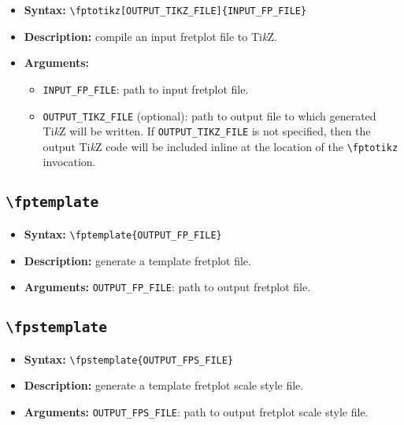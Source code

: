 \documentclass[12pt,letterpaper]{article}
\begin{document}
\begin{itemize}
  \item[] \textbf{\color{blue} Syntax:} \texttt{\textbackslash fptotikz[OUTPUT\_TIKZ\_FILE]\{INPUT\_FP\_FILE\}}
  \item[] \textbf{\color{blue} Description:} compile an input fretplot file to Ti\textit{k}Z.
  \item[] \textbf{\color{blue} Arguments:}
    \begin{itemize}
      \item \texttt{INPUT\_FP\_FILE}: path to input fretplot file.
      \item \texttt{OUTPUT\_TIKZ\_FILE} (optional): path to output file to which generated Ti\textit{k}Z will be written. If \texttt{OUTPUT\_TIKZ\_FILE} is not specified, then the output Ti\textit{k}Z code will be included inline at the location of the \texttt{\textbackslash fptotikz} invocation.
    \end{itemize}
\end{itemize}

\subsection{\texttt{\textbackslash fptemplate}}

\begin{itemize}
  \item[] \textbf{\color{blue} Syntax:} \texttt{\textbackslash fptemplate\{OUTPUT\_FP\_FILE\}}
  \item[] \textbf{\color{blue} Description:} generate a template fretplot file.
  \item[] \textbf{\color{blue} Arguments:} \texttt{OUTPUT\_FP\_FILE}: path to output fretplot file.
\end{itemize}

\subsection{\texttt{\textbackslash fpstemplate}}

\begin{itemize}
  \item[] \textbf{\color{blue} Syntax:} \texttt{\textbackslash fpstemplate\{OUTPUT\_FPS\_FILE\}}
  \item[] \textbf{\color{blue} Description:} generate a template fretplot scale style file.
  \item[] \textbf{\color{blue} Arguments:} \texttt{OUTPUT\_FPS\_FILE}: path to output fretplot scale style file.
\end{itemize}
\end{document}
